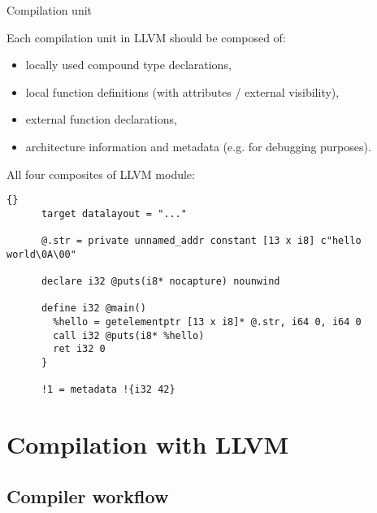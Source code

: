 \documentclass[8pt]{beamer}
\begin{document}
\begin{frame}[fragile]{Compilation unit}
  \begin{block}{Each compilation unit in LLVM should be composed of:}
    \begin{itemize}
      \item locally used compound type declarations,
      \item local function definitions (with attributes / external visibility),
      \item external function declarations,
      \item architecture information and metadata (e.g. for debugging
        purposes).
    \end{itemize}
  \end{block}

  \begin{exampleblock}{All four composites of LLVM module:}
    \begin{lstlisting}{}
      target datalayout = "..."

      @.str = private unnamed_addr constant [13 x i8] c"hello world\0A\00"

      declare i32 @puts(i8* nocapture) nounwind

      define i32 @main() 
        %hello = getelementptr [13 x i8]* @.str, i64 0, i64 0
        call i32 @puts(i8* %hello)
        ret i32 0
      }

      !1 = metadata !{i32 42}
    \end{lstlisting}
  \end{exampleblock}
\end{frame}

\section[Compilation]{Compilation with LLVM}
\subsection{Compiler workflow}
\end{document}
